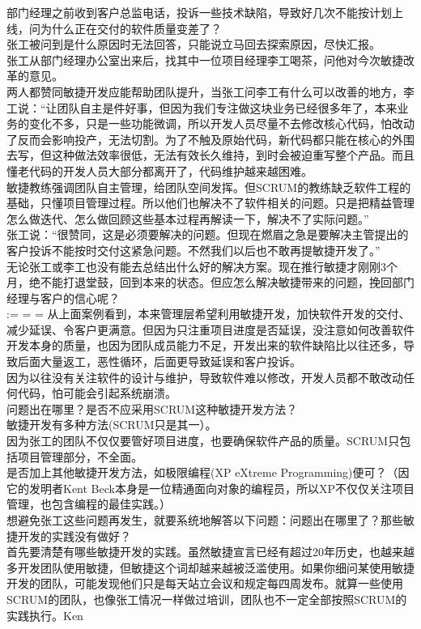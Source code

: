 部门经理之前收到客户总监电话，投诉一些技术缺陷，导致好几次不能按计划上线，问为什么正在交付的软件质量变差了？\\
张工被问到是什么原因时无法回答，只能说立马回去探索原因，尽快汇报。\\
张工从部门经理办公室出来后，找其中一位项目经理李工喝茶，问他对今次敏捷改革的意见。\\
两人都赞同敏捷开发应能帮助团队提升，当张工问李工有什么可以改善的地方，李工说：``让团队自主是件好事，但因为我们专注做这块业务已经很多年了，本来业务的变化不多，只是一些功能微调，所以开发人员尽量不去修改核心代码，怕改动了反而会影响投产，无法切割。为了不触及原始代码，新代码都只能在核心的外围去写，但这种做法效率很低，无法有效长久维持，到时会被迫重写整个产品。而且懂老代码的开发人员大部分都离开了，代码维护越来越困难。\\
敏捷教练强调团队自主管理，给团队空间发挥。但SCRUM的教练缺乏软件工程的基础，只懂项目管理过程。所以他们也解决不了软件相关的问题。只是把精益管理怎么做迭代、怎么做回顾这些基本过程再解读一下，解决不了实际问题。''\\
张工说：``很赞同，这是必须要解决的问题。但现在燃眉之急是要解决主管提出的客户投诉不能按时交付这紧急问题。不然我们以后也不敢再提敏捷开发了。''\\
无论张工或李工也没有能去总结出什么好的解决方案。现在推行敏捷才刚刚3个月，绝不能打退堂鼓，回到本来的状态。但应怎么解决敏捷带来的问题，挽回部门经理与客户的信心呢？\\
:= = =
从上面案例看到，本来管理层希望利用敏捷开发，加快软件开发的交付、减少延误、令客户更满意。但因为只注重项目进度是否延误，没注意如何改善软件开发本身的质量，也因为团队成员能力不足，开发出来的软件缺陷比以往还多，导致后面大量返工，恶性循环，后面更导致延误和客户投诉。\\
因为以往没有关注软件的设计与维护，导致软件难以修改，开发人员都不敢改动任何代码，怕可能会引起系统崩溃。\\
问题出在哪里？是否不应采用SCRUM这种敏捷开发方法？\\
敏捷开发有多种方法(SCRUM只是其一）。\\
因为张工的团队不仅仅要管好项目进度，也要确保软件产品的质量。SCRUM只包括项目管理部分，不全面。\\
是否加上其他敏捷开发方法，如极限编程(XP eXtreme
Programming)便可？（因它的发明者Kent
Beck本身是一位精通面向对象的编程员，所以XP不仅仅关注项目管理，也包含编程的最佳实践。）\\
想避免张工这些问题再发生，就要系统地解答以下问题：问题出在哪里了？那些敏捷开发的实践没有做好？\\
首先要清楚有哪些敏捷开发的实践。虽然敏捷宣言已经有超过20年历史，也越来越多开发团队使用敏捷，但敏捷这个词却越来越被泛滥使用。如果你细问某使用敏捷开发的团队，可能发现他们只是每天站立会议和规定每四周发布。就算一些使用SCRUM的团队，也像张工情况一样做过培训，团队也不一定全部按照SCRUM的实践执行。Ken
